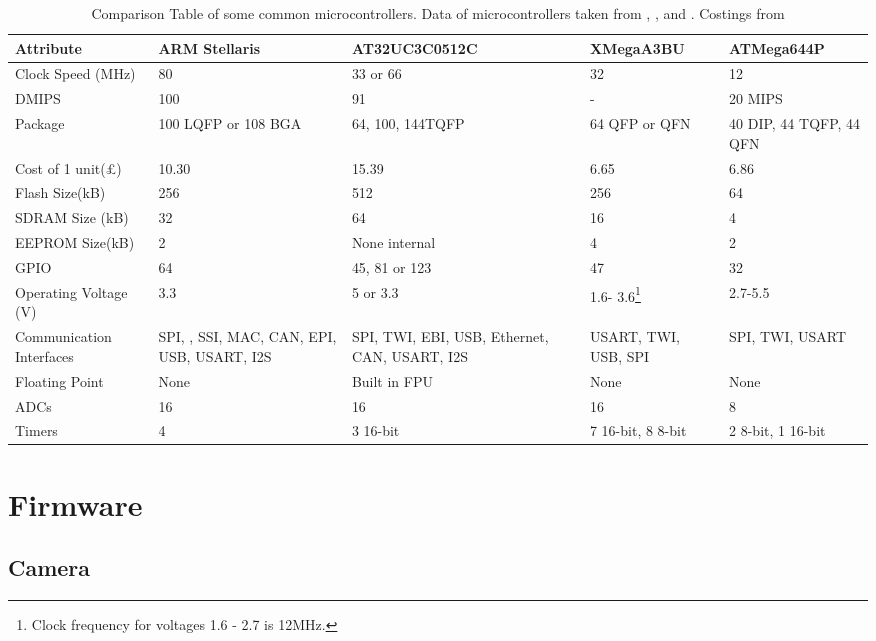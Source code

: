 \begin{table}
\caption{Comparison Table of some common microcontrollers. Data of microcontrollers taken from \cite{Atmel:UC3C}, \cite{Atmel:644P}, \cite{Atmel:A3BU} and \cite{ARM:Stellaris}. Costings from \cite{Farnell}}
\label{tab:uCComp}
\centering
\begin{tabular}{p{3.0cm}p{2.0cm}p{3cm}p{2.3cm}p{2.4cm}}\toprule
Attribute				& 	ARM Stellaris		&	AT32UC3C0512C 		&	XMegaA3BU	&	ATMega644P 	\\	\toprule
Clock Speed	(MHz)		&	80					&	33 or 66			&	32			&	12			\\\midrule
DMIPS					&	100					&	91					&	-			&	20 MIPS		\\\midrule
Package					&	100 LQFP or 108 BGA	&	64, 100, 144TQFP	&	64 QFP or QFN & 40 DIP, 44 TQFP, 44 QFN \\\midrule
Cost of 1 unit(\pounds)	&	10.30				& 15.39 &	6.65	 & 6.86\\\midrule
Flash Size(kB)			&	256					&	512					&	256			&	64 \\\midrule
SDRAM Size (kB)			&	32					&	64					&	16			&	4	\\\midrule
EEPROM Size(kB)			&	2					&	None internal		&	4			&	2 	\\\midrule
GPIO					&	64					& 	45, 81 or 123		&	47			& 	32	\\\midrule
Operating Voltage (V)	&	3.3					& 	5	or 3.3			& 	1.6- 3.6\footnote{Clock frequency for voltages 1.6 - 2.7 is 12MHz.}		& 	2.7-5.5	\\\midrule
Communication Interfaces &	SPI, \itc, SSI, MAC, CAN, EPI, USB, USART, I2S	& SPI, TWI, EBI, USB, Ethernet, CAN, USART, I2S	&	USART, TWI, USB, SPI 		&	SPI, TWI, USART \\\midrule
Floating Point			&	None				&	Built in FPU		&	None		&	None		\\\midrule
ADCs					&	16					&	16					&	16			&	8			\\\midrule
Timers					&	4					&	3 16-bit			& 7 16-bit, 8 8-bit & 2 8-bit, 1 16-bit \\
\bottomrule
\end{tabular}
\end{table}

\section{Firmware}
\subsection{Camera}

